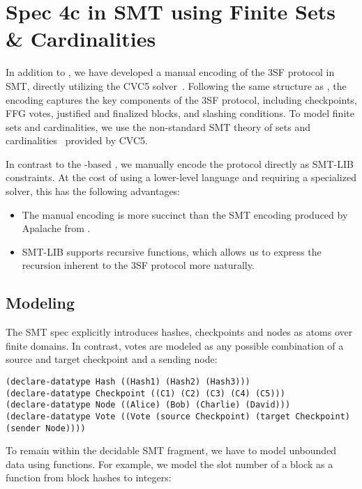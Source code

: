
\section{Spec 4c in SMT using Finite Sets \& Cardinalities}

In addition to \SpecFour{}, we have developed a manual encoding of the 3SF
protocol in SMT, directly utilizing the CVC5
solver~\cite{DBLP:conf/tacas/BarbosaBBKLMMMN22}. Following the same
structure as \SpecFour{}, the encoding captures the key components of the 3SF
protocol, including checkpoints, FFG votes, justified and finalized blocks,
and slashing conditions.
To model finite sets and cardinalities, we use the non-standard SMT theory of
sets and cardinalities~\cite{DBLP:journals/lmcs/BansalBRT18} provided by CVC5.

In contrast to the \tlap{}-based \SpecFour{}, we manually encode the protocol
directly as SMT-LIB constraints. At the cost of using a lower-level language and
requiring a specialized solver, this has the following advantages:
\begin{itemize}
  \item The manual encoding is more succinct than the SMT encoding produced by
    Apalache from \tlap{}.
  \item SMT-LIB supports recursive functions, which allows us to express the
    recursion inherent to the 3SF protocol more naturally.
\end{itemize}

\subsection{Modeling}
The SMT spec explicitly introduces hashes, checkpoints and nodes as atoms over
finite domains. In contrast, votes are modeled as any possible combination
of a source and target checkpoint and a sending node:

\begin{lstlisting}[language=smt]
(declare-datatype Hash ((Hash1) (Hash2) (Hash3)))
(declare-datatype Checkpoint ((C1) (C2) (C3) (C4) (C5)))
(declare-datatype Node ((Alice) (Bob) (Charlie) (David)))
(declare-datatype Vote ((Vote (source Checkpoint) (target Checkpoint) (sender Node))))
\end{lstlisting}

To remain within the decidable SMT fragment, we have to model unbounded data
using functions. For example, we model the slot number of a block as a function
from block hashes to integers:

